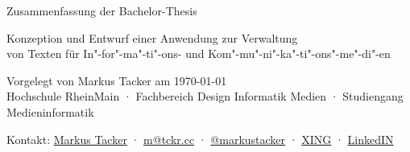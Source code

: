 \documentclass[11pt,a4paper]{article}
\begin{document}
\setmainfont[Mapping=tex-text]{Museo Sans}

\begin{center}
Zusammenfassung der Bachelor-Thesis\\
\begin{large}
Konzeption und Entwurf einer Anwendung zur Verwaltung\\von Texten für In"-for"-ma"-ti"-ons- und Kom"-mu"-ni"-ka"-ti"-ons"-me"-di"-en\\
\end{large}
\bigskip
\begin{tiny}
Vorgelegt von Markus Tacker am \today\\
Hochschule RheinMain · Fachbereich Design Informatik Medien · Studiengang Medieninformatik\\
\end{tiny}
\end{center}

\setmainfont[Mapping=tex-text,BoldFont={Vollkorn-Bold},ItalicFont={Vollkorn-Italic},BoldItalicFont={Vollkorn-Bold Italic}]{Vollkorn}
\setsansfont[Mapping=tex-text]{Museo Sans}



\begin{center}
\begin{small}
Kontakt: \href{http://tckr.cc/}{Markus Tacker} · \href{mailto:m@tckr.cc}{m@tckr.cc} · \href{http://twitter.com/markustacker}{@markustacker} · \href{https://www.xing.com/profile/Markus_Tacker}{XING} · \href{http://www.linkedin.com/in/markustacker}{LinkedIN}
\end{small}
\end{center}
\end{document}

